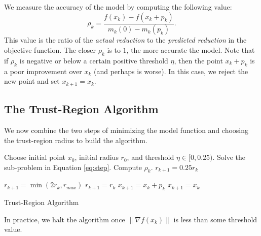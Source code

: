 We measure the accuracy of the model by computing the following value:
\[
\rho_k = \frac{f(x_k)-f(x_k+p_k)}{m_k(0) - m_k(p_k)}.
\]
This value is the ratio of the \emph{actual reduction} to the \emph{predicted reduction} in the objective function. The closer
$\rho_k$ is to $1$, the more accurate the model.
Note that if $\rho_k$ is negative or below a certain positive threshold $\eta$,
then the point $x_k+p_k$ is a poor improvement over $x_k$ (and perhaps is worse).
In this case, we reject the new point and set $x_{k+1} = x_k$.

\subsection*{The Trust-Region Algorithm}
We now combine the two steps of minimizing the model function and choosing the trust-region radius to build the algorithm.
\begin{algorithm}
\begin{algorithmic}[1]
    \State Choose initial point $x_0$, initial radius $r_0$, and threshold $\eta \in [0,0.25)$.
        \State Solve the sub-problem in Equation \ref{eq:step}.
        \State Compute $\rho_k$.
            \State $r_{k+1} = 0.25r_k$

        \Else
                \State $r_{k+1} = \min(2r_k, r_{max})$
            \Else
                \State $r_{k+1} = r_k$
            \EndIf
        \EndIf
            \State $x_{k+1} = x_k + p_k$
        \Else
            \State $x_{k+1} = x_k$
        \EndIf
    \EndFor
\EndProcedure
\end{algorithmic}
\caption{Trust-Region Algorithm}
\label{alg:trustregion}
\end{algorithm}
In practice, we halt the algorithm once $\|\nabla f(x_k)\|$ is less than some threshold value.
